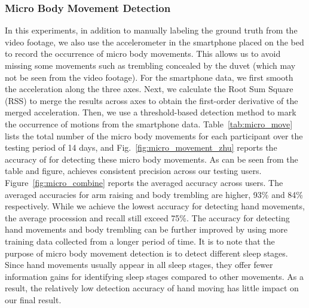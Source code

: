 \subsubsection{Micro Body Movement Detection}

In this experiments, in addition to manually labeling the ground truth from the video footage, we also use the accelerometer in the
smartphone placed on the bed to record the occurrence of micro body movements. This allows us to avoid missing some movements such as
trembling concealed by the duvet (which may not be seen from the video footage). For the smartphone data, we first smooth the acceleration
along the three axes. Next, we calculate the Root Sum Square (RSS) to merge the results across axes to obtain the first-order derivative of
the merged acceleration. Then, we use a threshold-based detection method to mark the occurrence of motions from the smartphone data.
Table~\ref{tab:micro_move} lists the total number of the micro body movements for each participant over the testing period of 14 days, and
Fig.~\ref{fig:micro_movement_zhu} reports the accuracy of {\systemname} for detecting these micro body movements. As can be seen from the
table and figure, \systemname achieves consistent precision across our testing users. Figure~\ref{fig:micro_combine} reports the averaged
accuracy across users. The averaged accuracies for arm raising and body trembling are higher, 93\% and 84\% respectively.  While we achieve
the lowest accuracy for detecting hand movements, the average procession and recall still exceed 75\%. The accuracy for detecting hand
movements and body trembling can be further improved by using more training data collected from a longer period of time. It is to note that
the purpose of micro body movement detection is to detect different sleep stages. Since hand movements usually appear in all sleep stages,
they offer fewer information gains for identifying sleep stages compared to other movements.  As a result, the relatively low detection
accuracy of hand moving has little impact on our final result.


